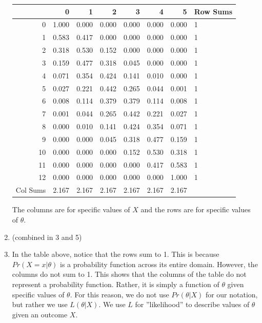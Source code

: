 \documentclass[12pt]{article}\usepackage[]{graphicx}\usepackage[]{color}
\begin{document}
\begin{enumerate}
\begin{table}[ht]
\centering
\begin{tabular}{rrrrrrrl}
  \hline
 & 0 & 1 & 2 & 3 & 4 & 5 & Row Sums \\ 
  \hline
0 & 1.000 & 0.000 & 0.000 & 0.000 & 0.000 & 0.000 & 1 \\ 
  1 & 0.583 & 0.417 & 0.000 & 0.000 & 0.000 & 0.000 & 1 \\ 
  2 & 0.318 & 0.530 & 0.152 & 0.000 & 0.000 & 0.000 & 1 \\ 
  3 & 0.159 & 0.477 & 0.318 & 0.045 & 0.000 & 0.000 & 1 \\ 
  4 & 0.071 & 0.354 & 0.424 & 0.141 & 0.010 & 0.000 & 1 \\ 
  5 & 0.027 & 0.221 & 0.442 & 0.265 & 0.044 & 0.001 & 1 \\ 
  6 & 0.008 & 0.114 & 0.379 & 0.379 & 0.114 & 0.008 & 1 \\ 
  7 & 0.001 & 0.044 & 0.265 & 0.442 & 0.221 & 0.027 & 1 \\ 
  8 & 0.000 & 0.010 & 0.141 & 0.424 & 0.354 & 0.071 & 1 \\ 
  9 & 0.000 & 0.000 & 0.045 & 0.318 & 0.477 & 0.159 & 1 \\ 
  10 & 0.000 & 0.000 & 0.000 & 0.152 & 0.530 & 0.318 & 1 \\ 
  11 & 0.000 & 0.000 & 0.000 & 0.000 & 0.417 & 0.583 & 1 \\ 
  12 & 0.000 & 0.000 & 0.000 & 0.000 & 0.000 & 1.000 & 1 \\ 
  Col Sums & 2.167 & 2.167 & 2.167 & 2.167 & 2.167 & 2.167 &  \\ 
   \hline
\end{tabular}
\end{table}


The columns are for specific values of $X$ and the rows are for specific values of $\theta$.

\item (combined in 3 and 5)
\item In the table above, notice that the rows sum to 1. This is because $Pr(X = x | \theta)$ is a probability function across its entire domain. However, the columns do not sum to 1. This shows that the columns of the table do not represent a probability function. Rather, it is simply a function of $\theta$ given specific values of $\theta$. For this reason, we do not use $Pr( \theta | X)$ for our notation, but rather we use $L(\theta | X)$. We use $L$ for  ''likelihood'' to describe values of $\theta$ given an outcome $X$.


\end{enumerate}
\end{document}
